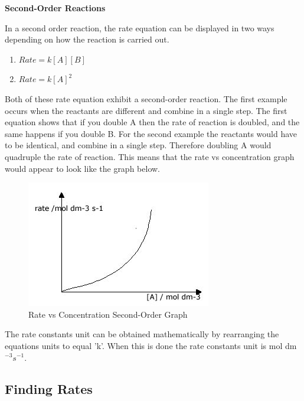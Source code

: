 \textbf{Second-Order Reactions}

In a second order reaction, the rate equation can be displayed in two ways depending on how the reaction is carried out.

\begin{enumerate}
\item $Rate = k[A] [B]$
\item $Rate = k[A]^2$
\end{enumerate}

Both of these rate equation exhibit a second-order reaction. The first example occurs when the reactants are different and combine in a single step. The first equation shows that if you double A then the rate of reaction is doubled, and the same happens if you double B. For the second example the reactants would have to be identical, and combine in a single step. Therefore doubling A would quadruple the rate of reaction. This means that the rate vs concentration graph would appear to look like the graph below.

\begin{figure}[H]
    \includegraphics[width=\textwidth]{./Planning/Images/SecondOrder.jpg}
    \caption{ Rate vs Concentration Second-Order Graph} \label{fig:Second Order Graph}
\end{figure}

The rate constants unit can be obtained mathematically by rearranging the equations units to equal 'k'. When this is done the rate constants unit is mol dm$^{-3} s^{-1}$.







	\subsection{Finding Rates}



